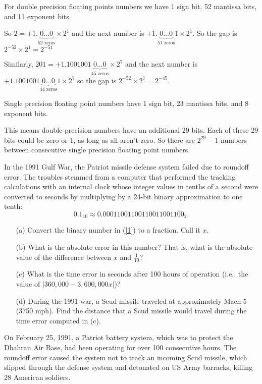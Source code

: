 \documentclass[10pt]{article}
\begin{document}
\begin{solution}[Solution]
For double precision floating points numbers we have 1 sign bit, 52 mantissa bits, and 11 exponent bits.

So \( 2=+1.\underbrace{0\ldots0}_{52 \text{ zeros}} \times 2^1 \) and the next number is \( +1.\underbrace{0\ldots0}_{51 \text{ zeros}}1 \times 2^1\). So the gap is \( 2^{-52}\times 2^{1} = 2^{-51} \)

Similarly, \( 201 = +1.1001001\underbrace{0\ldots0}_{45\text{ zeros}} \times 2^{7} \) and the next number is \( +1.1001001\underbrace{0\ldots0}_{44\text{ zeros}}1\times 2^{7} \) so the gap is \( 2^{-52}\times 2^{7} = 2^{-45} \).

Single precision floating point numbers have 1 sign bit, 23 mantissa bits, and 8 exponent bits.

This means double precision numbers have an additional 29 bits.  Each of these \( 29 \) bits could be zero or 1, as long as all aren't zero.
So there are \( 2^{29}-1 \) numbers between consecutive single precision floating point numbers.
\end{solution}


\begin{problem}[Exercise 3]
In the 1991 Gulf War, the Patriot missile defense system failed due to roundoff error.  
The troubles stemmed from a computer that performed the tracking calculations with an internal
clock whose integer values in tenths of a second were converted to seconds by multiplying by
a 24-bit binary approximation to one tenth:
\begin{equation}
0.1_{10} \approx 0.00011001100110011001100_2 . \label{1}
\end{equation}
\begin{enumerate}
    \item[(a)] Convert the binary number in (\ref{1}) to a fraction.  Call it \(x\).
    \item[(b)] What is the absolute error in this number?  That is, what is the absolute value of the difference between \( x \) and \( \frac{1}{10} \)?
    \item[(c)] What is the time error in seconds after 100 hours of operation (i.e., the value of \(| 360,000 - 3,600,000 x |\))?
    \item[(d)] During the 1991 war, a Scud missile traveled at approximately Mach 5 (3750 mph).  Find the distance that a Scud missile would travel during the time error computed in (c).
\end{enumerate}
On February 25, 1991, a Patriot battery system, which was to protect the Dhahran Air Base, had
been operating for over 100 consecutive hours.  The roundoff error caused the system not to 
track an incoming Scud missile, which slipped through the defense system and detonated on US
Army barracks, killing 28 American soldiers.
\end{problem}
\end{document}
